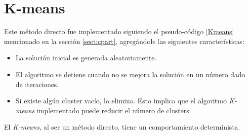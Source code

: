 \section{K-means}  \label{chap:ikmeans}

    Este método directo fue implementado siguiendo el pseudo-código \ref{Kmeans}
mencionado en la sección \ref{sect:cpart}, agregándole las siguientes
características:
\begin{itemize}
    \item La solución inicial es generada aleatoriamente.
    \item El algoritmo se detiene cuando no se mejora la solución en un número
dado de iteraciones.
	\item Si existe algún cluster vacío, lo elimina. Esto implica que el
algoritmo \emph{K-means} implementado puede reducir el número de clusters.
\end{itemize}
    El \emph{K-means}, al ser un método directo, tiene un comportamiento
determinista.

